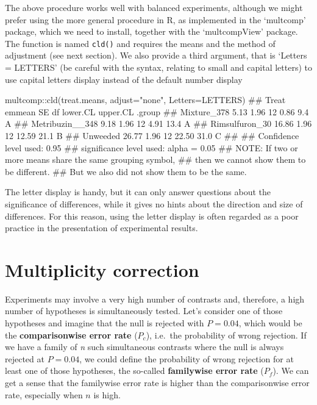 \documentclass[a4paper,12pt,oneside]{book}
\newenvironment{Shaded}{\begin{snugshade}}{\end{snugshade}}
\newcommand{\SpecialCharTok}[1]{#1}
\newcommand{\StringTok}[1]{#1}
\newcommand{\DocumentationTok}[1]{#1}
\newcommand{\FunctionTok}[1]{#1}
\newcommand{\AttributeTok}[1]{#1}
\newcommand{\AlertTok}[1]{#1}
\newcommand{\NormalTok}[1]{#1}
\begin{document}
The above procedure works well with balanced experiments, although we might prefer using the more general procedure in R, as implemented in the `multcomp' package, which we need to install, together with the `multcompView' package. The function is named \texttt{cld()} and requires the means and the method of adjustment (see next section). We also provide a third argument, that is `Letters = LETTERS' (be careful with the syntax, relating to small and capital letters) to use capital letters display instead of the default number display

\begin{Shaded}
\begin{Highlighting}[]
\NormalTok{multcomp}\SpecialCharTok{::}\FunctionTok{cld}\NormalTok{(treat.means, }\AttributeTok{adjust=}\StringTok{"none"}\NormalTok{, }\AttributeTok{Letters=}\NormalTok{LETTERS)}
\DocumentationTok{\#\#  Treat           emmean   SE df lower.CL upper.CL .group}
\DocumentationTok{\#\#  Mixture\_378       5.13 1.96 12     0.86      9.4  A    }
\DocumentationTok{\#\#  Metribuzin\_\_348   9.18 1.96 12     4.91     13.4  A    }
\DocumentationTok{\#\#  Rimsulfuron\_30   16.86 1.96 12    12.59     21.1   B   }
\DocumentationTok{\#\#  Unweeded         26.77 1.96 12    22.50     31.0    C  }
\DocumentationTok{\#\# }
\DocumentationTok{\#\# Confidence level used: 0.95 }
\DocumentationTok{\#\# significance level used: alpha = 0.05 }
\DocumentationTok{\#\# }\AlertTok{NOTE}\DocumentationTok{: If two or more means share the same grouping symbol,}
\DocumentationTok{\#\#       then we cannot show them to be different.}
\DocumentationTok{\#\#       But we also did not show them to be the same.}
\end{Highlighting}
\end{Shaded}

The letter display is handy, but it can only answer questions about the significance of differences, while it gives no hints about the direction and size of differences. For this reason, using the letter display is often regarded as a poor practice in the presentation of experimental results.

\hypertarget{multiplicity-correction}{%
\section{Multiplicity correction}\label{multiplicity-correction}}

Experiments may involve a very high number of contrasts and, therefore, a high number of hypotheses is simultaneously tested. Let's consider one of those hypotheses and imagine that the null is rejected with \(P = 0.04\), which would be the \textbf{comparisonwise error rate} (\(P_c\)), i.e.~the probability of wrong rejection. If we have a family of \emph{n} such simultaneous contrasts where the null is always rejected at \(P = 0.04\), we could define the probability of wrong rejection for at least one of those hypotheses, the so-called \textbf{familywise error rate} (\(P_f\)). We can get a sense that the familywise error rate is higher than the comparisonwise error rate, especially when \(n\) is high.
\end{document}
